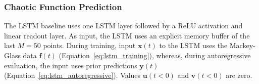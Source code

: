 

\subsubsection*{Chaotic Function Prediction}


The LSTM baseline uses one LSTM layer followed by a ReLU activation and linear readout layer. As input, the LSTM uses an explicit memory buffer of the last $M=50$ points. During training, input $\mathbf{x}(t)$ to the LSTM uses the Mackey-Glass data $\mathbf{f}(t)$ (Equation~\ref{eq:lstm_training}), whereas, during autoregressive evaluation, the input uses prior predictions $\mathbf{y}(t)$ (Equation~\ref{eq:lstm_autoregressive}). Values $\mathbf{u}(t<0)$ and $\mathbf{v}(t<0)$ are zero.

